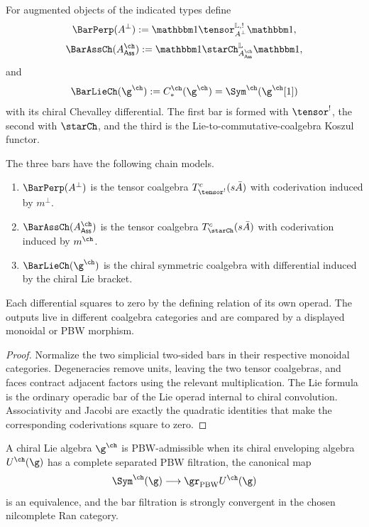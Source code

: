\begin{definition}
For augmented objects of the indicated types define
\[
 \BarPerp(A^\perp)
   :=\mathbbm1\tensor_{A^\perp}^{\mathbb L,!}\mathbbm1,
\]
\[
 \BarAssCh(A^{\ch}_{\mathsf{Ass}})
   :=\mathbbm1\starCh_{A^{\ch}_{\mathsf{Ass}}}^{\mathbb L}\mathbbm1,
\]
and
\[
 \BarLieCh(\g^{\ch})
   :=C_*^{\ch}(\g^{\ch})
   =\Sym^{\ch}(\g^{\ch}[1])
\]
with its chiral Chevalley differential.  The first bar is formed with $\tensor^!$, the second with $\starCh$, and the third is the Lie-to-commutative-coalgebra Koszul functor.
\end{definition}

\begin{theorem}
The three bars have the following chain models.
\begin{enumerate}
\item $\BarPerp(A^\perp)$ is the tensor coalgebra $T^c_{\tensor^!}(s\bar A)$ with coderivation induced by $m^\perp$.
\item $\BarAssCh(A^{\ch}_{\mathsf{Ass}})$ is the tensor coalgebra $T^c_{\starCh}(s\bar A)$ with coderivation induced by $m^{\ch}$.
\item $\BarLieCh(\g^{\ch})$ is the chiral symmetric coalgebra with differential induced by the chiral Lie bracket.
\end{enumerate}
Each differential squares to zero by the defining relation of its own operad.  The outputs live in different coalgebra categories and are compared by a displayed monoidal or PBW morphism.
\end{theorem}
\begin{proof}
Normalize the two simplicial two-sided bars in their respective monoidal categories.  Degeneracies remove units, leaving the two tensor coalgebras, and faces contract adjacent factors using the relevant multiplication.  The Lie formula is the ordinary operadic bar of the Lie operad internal to chiral convolution.  Associativity and Jacobi are exactly the quadratic identities that make the corresponding coderivations square to zero.
\end{proof}

\begin{definition}
A chiral Lie algebra $\g^{\ch}$ is PBW-admissible when its chiral enveloping algebra $U^{\ch}(\g)$ has a complete separated PBW filtration, the canonical map
\[
 \Sym^{\ch}(\g)\longrightarrow\gr_{\mathrm{PBW}}U^{\ch}(\g)
\]
is an equivalence, and the bar filtration is strongly convergent in the chosen nilcomplete Ran category.
\end{definition}

